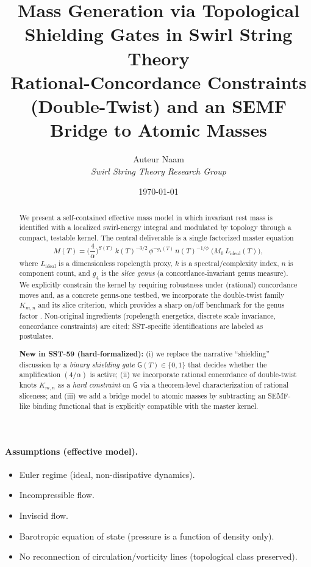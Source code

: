 \documentclass[11pt, a4paper]{article}
\title{\textbf{Mass Generation via Topological Shielding Gates in Swirl String Theory}\\
\large Rational-Concordance Constraints (Double-Twist) and an SEMF Bridge to Atomic Masses}
\author{Auteur Naam \\ \textit{Swirl String Theory Research Group}}
\date{\today}
\begin{document}
\maketitle

\begin{abstract}
We present a self-contained effective mass model in which invariant rest mass is identified with a localized swirl-energy integral and modulated by topology through a compact, testable kernel. The central deliverable is a single factorized master equation
\[
M(T)=\Big(\frac{4}{\alpha}\Big)^{S(T)}\,k(T)^{-3/2}\,\phi^{-g_4(T)}\,n(T)^{-1/\phi}\;\Big(M_0\,L_{\mathrm{ideal}}(T)\Big),
\]
where \(L_{\mathrm{ideal}}\) is a dimensionless ropelength proxy, \(k\) is a spectral/complexity index, \(n\) is component count, and \(g_4\) is the \emph{slice genus} (a concordance-invariant genus measure). We explicitly constrain the kernel by requiring robustness under (rational) concordance moves and, as a concrete genus-one testbed, we incorporate the double-twist family \(K_{m,n}\) and its slice criterion, which provides a sharp on/off benchmark for the genus factor \cite{Lee2025DoubleTwist}. Non-original ingredients (ropelength energetics, discrete scale invariance, concordance constraints) are cited; SST-specific identifications are labeled as postulates.
\par\smallskip
\textbf{New in SST-59 (hard-formalized):} (i) we replace the narrative ``shielding'' discussion by a \emph{binary shielding gate}
\(\mathsf{G}(T)\in\{0,1\}\) that decides whether the amplification \((4/\alpha)\) is active; (ii) we incorporate rational concordance of
double-twist knots \(K_{m,n}\) as a \emph{hard constraint} on \(\mathsf{G}\) via a theorem-level characterization of rational sliceness; and
(iii) we add a bridge model to atomic masses by subtracting an SEMF-like binding functional that is explicitly compatible with the master kernel.
\end{abstract}

\paragraph{Assumptions (effective model).}
\begin{itemize}
    \item Euler regime (ideal, non-dissipative dynamics).
    \item Incompressible flow.
    \item Inviscid flow.
    \item Barotropic equation of state (pressure is a function of density only).
    \item No reconnection of circulation/vorticity lines (topological class preserved).
\end{itemize}
\end{document}
